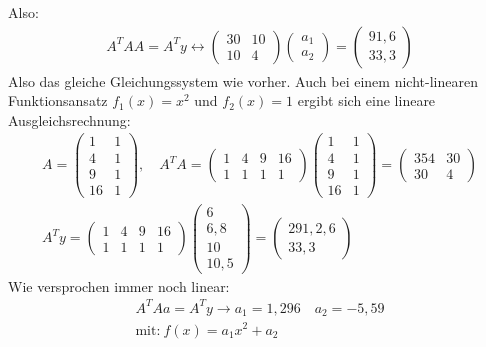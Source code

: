 \documentclass{scrartcl}
\begin{document}
Also:
\begin{align*}
A^T A A = A^T y \leftrightarrow \begin{pmatrix}
30 & 10 \\
10 & 4
\end{pmatrix} \begin{pmatrix}
a_1 \\ 
a_2
\end{pmatrix}= \begin{pmatrix}
91,6 \\
33,3
\end{pmatrix}
\end{align*}
Also das gleiche Gleichungssystem wie vorher.
Auch bei einem nicht-linearen Funktionsansatz $f_1(x)=x^2$ und $f_2(x)=1$ ergibt sich eine lineare Ausgleichsrechnung:
\begin{align*}
A=\begin{pmatrix}
1 & 1\\
4 & 1\\
9 & 1\\
16 & 1
\end{pmatrix}, \quad A^T A = \begin{pmatrix}
1 & 4 & 9 & 16\\
1 & 1 & 1 & 1
\end{pmatrix} \begin{pmatrix}
1 & 1\\
4 & 1\\
9 & 1\\
16 & 1
\end{pmatrix}
=\begin{pmatrix}
354 & 30 \\
30 & 4
\end{pmatrix} \\
A^T y = \begin{pmatrix}
1 & 4 & 9 & 16\\
1 & 1 & 1 & 1
\end{pmatrix} \begin{pmatrix}
6 \\
6,8 \\
10\\
10,5
\end{pmatrix}= \begin{pmatrix}
291,2,6 \\
33,3
\end{pmatrix}
\end{align*}  
Wie versprochen immer noch linear:
\begin{align*}
A^T A a = A^T y \rightarrow a_1=1,296 \quad a_2=-5,59 \\
\text{mit:} \ f(x)=a_1 x^2 + a_2
\end{align*}
\end{document}
